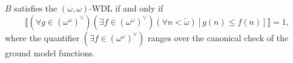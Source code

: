 $B$ satisfies the $(\omega, \omega)$-WDL if and only if
$$
\llbracket (\forall g \in (\omega^{\omega})^{\vee}) (\exists f \in (\omega^{\omega})^{\vee}) (\forall n < \check{\omega}) [g(n) \leq f(n)] \rrbracket = 1,
$$
where the quantifier $(\exists f \in (\omega^{\omega})^{\vee})$ ranges over the canonical check of the ground model functions.
